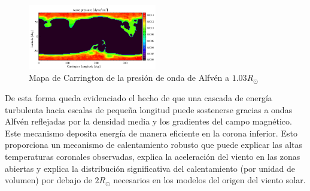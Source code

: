 \documentclass[a4paper,11pt]{report}
\begin{document}
\begin{figure}%
\begin{center}
\includegraphics[width=0.5\textwidth]{figuras/presion_alfven_vander2010.png}
\end{center}
\caption{Mapa de Carrington de la presión de onda de Alfvén a $1.03 R_{\odot}$}
\label{resultados2}
\end{figure}



De esta forma queda evidenciado el hecho de que una cascada de energía turbulenta hacia escalas de pequeña longitud puede sostenerse gracias a ondas Alfvén reflejadas por la densidad media y los gradientes del campo magnético. Este mecanismo deposita energía de manera eficiente en la corona inferior. Esto proporciona un mecanismo de calentamiento robusto que puede explicar las altas temperaturas coronales observadas, explica la aceleración del viento en las zonas abiertas y explica la distribución significativa del calentamiento (por unidad de volumen) por debajo de $2R_\odot$ necesarios en los modelos del origen del viento solar.

\end{document}
